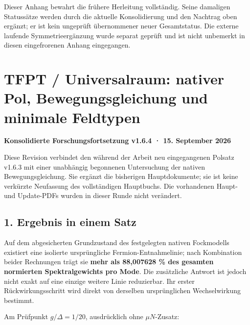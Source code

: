 Dieser Anhang bewahrt die frühere Herleitung vollständig. Seine
damaligen Statussätze werden durch die aktuelle Konsolidierung und den
Nachtrag oben ergänzt; er ist kein ungeprüft übernommener neuer
Gesamtstatus. Die externe laufende Symmetrieergänzung wurde separat
geprüft und ist nicht unbemerkt in diesen eingefrorenen Anhang
eingegangen.

\section{TFPT / Universalraum: nativer Pol, Bewegungsgleichung und
minimale
Feldtypen}\label{tfpt-universalraum-nativer-pol-bewegungsgleichung-und-minimale-feldtypen}

\textbf{Konsolidierte Forschungsfortsetzung v1.6.4 · 15. September 2026}

Diese Revision verbindet den während der Arbeit neu eingegangenen
Polsatz v1.6.3 mit einer unabhängig begonnenen Untersuchung der nativen
Bewegungsgleichung. Sie ergänzt die bisherigen Hauptdokumente; sie ist
keine verkürzte Neufassung des vollständigen Hauptbuchs. Die vorhandenen
Haupt- und Update-PDFs wurden in dieser Runde nicht verändert.

\subsection{1. Ergebnis in einem Satz}\label{ergebnis-in-einem-satz}

Auf dem abgesicherten Grundzustand des festgelegten nativen Fockmodells
existiert eine isolierte ursprüngliche Fermion-Entnahmelinie; nach
Kombination beider Rechnungen trägt sie \textbf{mehr als 88,007628 \%
des gesamten normierten Spektralgewichts pro Mode}. Die zusätzliche
Antwort ist jedoch nicht exakt auf eine einzige weitere Linie
reduzierbar. Ihr erster Rückwirkungsschritt wird direkt von derselben
ursprünglichen Wechselwirkung bestimmt.

Am Prüfpunkt \(g/\Delta=1/20\), ausdrücklich ohne \(\mu N\)-Zusatz:

